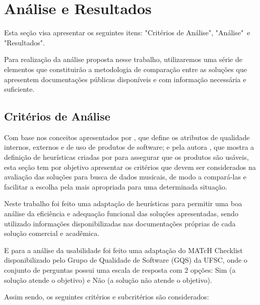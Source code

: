\chapter{Análise e Resultados} \label{cap:analiseResultados}
Esta seção visa apresentar os seguintes itens: "Critérios de Análise", "Análise"\ e "Resultados".

Para realização da análise proposta nesse trabalho, utilizaremos uma série de elementos que constituirão a metodologia de comparação entre as soluções que apresentem documentações públicas disponíveis e com informação necessária e suficiente.

\section{Critérios de Análise}

Com base nos conceitos apresentados por , que define os atributos de qualidade internos, externos e de uso de produtos de software; e pela autora , que mostra a definição de heurísticas criadas por  para assegurar que os produtos são usáveis, esta seção tem por objetivo apresentar os critérios que devem ser considerados na avaliação das soluções para busca de dados musicais, de modo a compará-las e facilitar a escolha pela mais apropriada para uma determinada situação.

Neste trabalho foi feito uma adaptação de heurísticas para permitir uma boa análise da eficiência e adequação funcional das soluções apresentadas, sendo utilizado informações disponibilizadas nas documentações próprias de cada solução comercial e acadêmica.

E para a análise da usabilidade foi feito uma adaptação do MATcH Checklist disponibilizado pelo Grupo de Qualidade de Software (GQS) da UFSC, onde o conjunto de perguntas possui uma escala de resposta com 2 opções: Sim (a solução atende o objetivo) e Não (a solução não atende o objetivo).

Assim sendo, os seguintes critérios e subcritérios são considerados:

